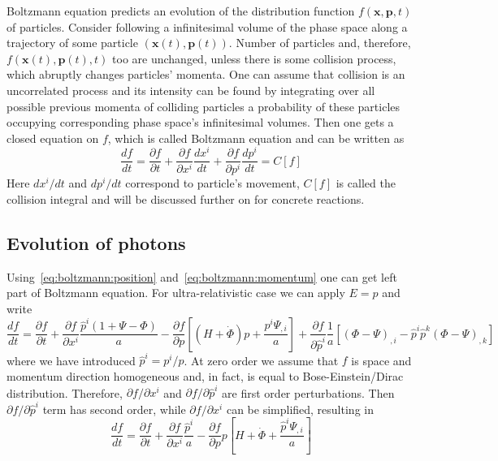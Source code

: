 \documentclass[12pt]{extarticle}
\numberwithin{problem}{section}
\numberwithin{theorem}{section}
\begin{document}
	Boltzmann equation predicts an evolution of the distribution function $f(\mathbf{x},\mathbf{p},t)$ of particles. Consider following a infinitesimal volume of the phase space along a trajectory of some particle $(\mathbf{x}(t),\mathbf{p}(t))$. Number of particles and, therefore, $f(\mathbf{x}(t),\mathbf{p}(t), t)$ too are unchanged, unless there is some collision process, which abruptly changes particles' momenta. One can assume that collision is an uncorrelated process and its intensity can be found by integrating over all possible previous momenta of colliding particles a probability of these particles occupying corresponding phase space's infinitesimal volumes. Then one gets a closed equation on $f$, which is called Boltzmann equation and can be written as 
	\begin{equation}
		\frac{df}{dt} = \frac{\partial f}{\partial t} + \frac{\partial f}{\partial x^i} \frac{dx^i}{dt} + \frac{\partial f}{\partial p^i} \frac{dp^i}{dt} = C[f]
	\end{equation}
	Here $dx^i/dt$ and $dp^i/dt$ correspond to particle's movement, $C[f]$ is called the collision integral and will be discussed further on for concrete reactions.
	
	\subsection{Evolution of photons}
	Using~\ref{eq:boltzmann:position} and~\ref{eq:boltzmann:momentum} one can get left part of Boltzmann equation. For ultra-relativistic case we can apply $E = p$ and write
	\begin{equation}
		\label{eq:boltzmann:photon}
		\frac{df}{dt} = \frac{\partial f}{\partial t} + \frac{\partial f}{\partial x^i}\frac{\hat{p}^i(1 + \Psi - \Phi)}{a} - \frac{\partial f}{\partial p}\left[(H + \dot{\Phi})p + \frac{p^i\Psi_{,i}}{a}\right] + \frac{\partial f}{\partial \hat{p}^i}\frac{1}{a}\left[(\Phi - \Psi)_{,i} - \hat{p}^i\hat{p}^k(\Phi - \Psi)_{,k}\right]
	\end{equation}
	where we have introduced $\hat{p}^i = p^i / p$. At zero order we assume that $f$ is space and momentum direction homogeneous and, in fact, is equal to Bose-Einstein/Dirac distribution. Therefore, $\partial f/\partial x^i$ and $\partial f/\partial \hat{p}^i$ are first order perturbations. Then $\partial f/\partial\hat{p}^i$ term has second order, while $\partial f/\partial x^i$ can be simplified, resulting in
	\begin{equation}
		\frac{df}{dt} = \frac{\partial f}{\partial t} + \frac{\partial f}{\partial x^i}\frac{\hat{p}^i}{a} - \frac{\partial f}{\partial p}p\left[H + \dot{\Phi} + \frac{\hat{p}^i\Psi_{,i}}{a}\right]
	\end{equation}
\end{document}
